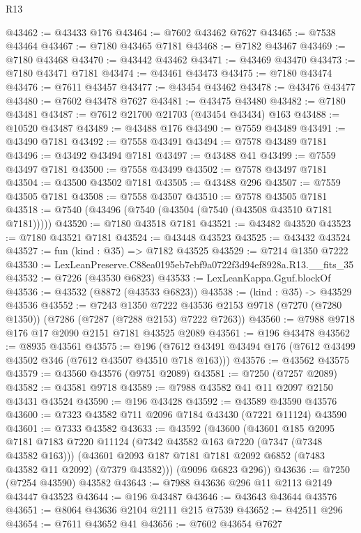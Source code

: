 \begin{lexlean}{R13}
\begin{coremodule}
@43462 := @43433 @176
@43464 := @7602 @43462 @7627
@43465 := @7538 @43464
@43467 := @7180 @43465 @7181
@43468 := @7182 @43467
@43469 := @7180 @43468
@43470 := @43442 @43462
@43471 := @43469 @43470
@43473 := @7180 @43471 @7181
@43474 := @43461 @43473
@43475 := @7180 @43474
@43476 := @7611 @43457
@43477 := @43454 @43462
@43478 := @43476 @43477
@43480 := @7602 @43478 @7627
@43481 := @43475 @43480
@43482 := @7180 @43481
@43487 := @7612 @21700 @21703 (@43454 @43434) @163
@43488 := @10520 @43487
@43489 := @43488 @176
@43490 := @7559 @43489
@43491 := @43490 @7181
@43492 := @7558 @43491
@43494 := @7578 @43489 @7181
@43496 := @43492 @43494 @7181
@43497 := @43488 @41
@43499 := @7559 @43497 @7181
@43500 := @7558 @43499
@43502 := @7578 @43497 @7181
@43504 := @43500 @43502 @7181
@43505 := @43488 @296
@43507 := @7559 @43505 @7181
@43508 := @7558 @43507
@43510 := @7578 @43505 @7181
@43518 := @7540 (@43496 (@7540 (@43504 (@7540 (@43508 @43510 @7181 @7181)))))
@43520 := @7180 @43518 @7181
@43521 := @43482 @43520
@43523 := @7180 @43521 @7181
@43524 := @43448 @43523
@43525 := @43432 @43524
@43527 := fun (kind : @35) => @7182 @43525
@43529 := @7214 @1350 @7222
@43530 := LexLeanPreserve.C88ea0195eb7ebf9a0722f3d94ef8928a.R13.__fits_35
@43532 := @7226 (@43530 @6823)
@43533 := LexLeanKappa.Gguf.blockOf
@43536 := @43532 (@8872 (@43533 @6823))
@43538 := (kind : @35) -> @43529 @43536
@43552 := @7243
    @1350
    @7222
    @43536
    @2153
    @9718
    (@7270 (@7280 @1350))
    (@7286 (@7287 (@7288 @2153) @7222 @7263))
@43560 := @7988 @9718 @176 @17 @2090 @2151 @7181 @43525 @2089
@43561 := @196 @43478
@43562 := @8935 @43561
@43575 := @196 (@7612 @43491 @43494 @176 (@7612 @43499 @43502 @346 (@7612 @43507 @43510 @718 @163)))
@43576 := @43562 @43575
@43579 := @43560 @43576 (@9751 @2089)
@43581 := @7250 (@7257 @2089)
@43582 := @43581 @9718
@43589 := @7988 @43582 @41 @11 @2097 @2150 @43431 @43524
@43590 := @196 @43428
@43592 := @43589 @43590 @43576
@43600 := @7323 @43582 @711 @2096 @7184 @43430 (@7221 @11124) @43590
@43601 := @7333 @43582
@43633 := @43592
    (@43600
      (@43601
        @185
        @2095
        @7181
        @7183
        @7220
        @11124
        (@7342 @43582 @163 @7220 (@7347 (@7348 @43582 @163)))
        (@43601 @2093 @187 @7181 @7181 @2092 @6852 (@7483 @43582 @11 @2092) (@7379 @43582)))
      (@9096 @6823 @296))
@43636 := @7250 (@7254 @43590) @43582
@43643 := @7988 @43636 @296 @11 @2113 @2149 @43447 @43523
@43644 := @196 @43487
@43646 := @43643 @43644 @43576
@43651 := @8064 @43636 @2104 @2111 @215 @7539
@43652 := @42511 @296
@43654 := @7611 @43652 @41
@43656 := @7602 @43654 @7627

\end{coremodule}
\end{lexlean}
